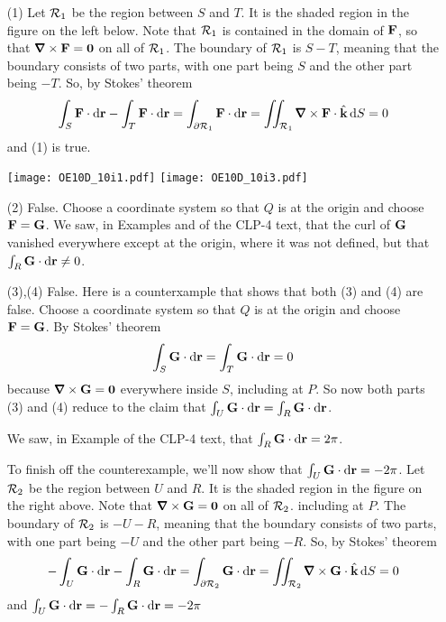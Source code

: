 \begin{solution}
\begin{itemize}\itemsep1pt \parskip0pt  %
\item[(1)] 
Let $\mathcal{R}_1$ be the region between $S$ and $T$. It is the shaded region 
in the figure on the left below. Note that $\mathcal{R}_1$ is contained in the 
domain of $\mathbf{F}$, so that $\vnabla\times\vF=\vZero$ on all of $\mathcal{R}_1$.
The boundary of $\mathcal{R}_1$ is $S-T$, meaning that the boundary consists 
of two parts, with one part being $S$ and the other part being $-T$. 
So, by Stokes' theorem
\begin{equation*}
\int_S \vF\cdot\dee{\vr} - \int_T \vF\cdot\dee{\vr}
=\int_{\partial \cR_1} \vF\cdot\dee{\vr}
=\dblInt_{\cR_1} \vnabla\times\vF\cdot\hk\, \dee{S}
=0
\end{equation*}
and (1) is true.
 
  \begin{center}
       \texttt{[image: OE10D\_10i1.pdf]}\qquad\qquad
       \texttt{[image: OE10D\_10i3.pdf]}
  \end{center}

\item[(2)] False. Choose a coordinate system so that $Q$ is at the origin
and choose $\mathbf{F}=\mathbf{G}$.
We saw, in Examples  and
 of the CLP-4 text, that the curl of  
$\mathbf{G}$ vanished everywhere except at the origin, where it was not defined,
but that $\int_R \mathbf{G}\cdot\mathrm{d}\mathbf{r} \ne 0$.

\item[(3),(4)] False. Here is a counterxample that shows that both
(3) and (4) are false. Choose a coordinate system so that $Q$ is 
at the origin and choose $\mathbf{F}=\mathbf{G}$. By Stokes' theorem 
\begin{equation*}
\int_S \mathbf{G}\cdot\mathrm{d}\mathbf{r} 
= \int_T \mathbf{G}\cdot\mathrm{d}\mathbf{r} = 0
\end{equation*} 
because $\vnabla\times\vG=\vZero$ everywhere inside $S$, including at $P$.
So now both parts (3) and (4) reduce to the claim that 
$\int_U \mathbf{G}\cdot\mathrm{d}\mathbf{r} 
= \int_R \mathbf{G}\cdot\mathrm{d}\mathbf{r}$.

We saw, in Example  of the CLP-4 text, that  $\int_R \mathbf{G}\cdot\mathrm{d}\mathbf{r} = 2\pi$. 

To finish off the counterexample,
we'll now show that $\int_U \mathbf{G}\cdot\mathrm{d}\mathbf{r} = -2\pi$.
Let $\mathcal{R}_2$ be the region between $U$ and $R$. It is the shaded region 
in the figure on the right above. Note that $\vnabla\times\vG=\vZero$ 
on all of $\mathcal{R}_2$. including at $P$.
The boundary of $\mathcal{R}_2$ is $-U-R$, meaning that the boundary consists 
of two parts, with one part being $-U$ and the other part being $-R$. 
So, by Stokes' theorem
\begin{equation*}
-\int_U \vG\cdot\dee{\vr} - \int_R \vG\cdot\dee{\vr}
=\int_{\partial \cR_2} \vG\cdot\dee{\vr}
=\dblInt_{\cR_2} \vnabla\times\vG\cdot\hk\, \dee{S}
=0
\end{equation*}
and 
$\int_U \mathbf{G}\cdot\mathrm{d}\mathbf{r} =-\int_R \mathbf{G}\cdot\mathrm{d}\mathbf{r} = -2\pi$



\end{itemize}
\end{solution}
